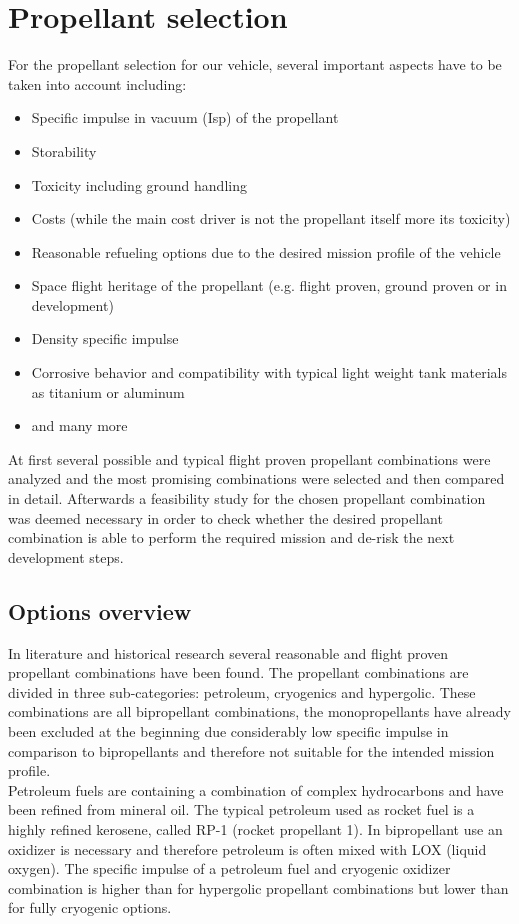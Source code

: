 \chapter{Propellant selection}
\qquad For the propellant selection for our vehicle, several important aspects have to be taken into account including:
\begin{itemize}
	\item 	Specific impulse in vacuum (Isp) of the propellant
	\item	Storability
	\item	Toxicity including ground handling
	\item	Costs (while the main cost driver is not the propellant itself more its toxicity)
	\item	Reasonable refueling options due to the desired mission profile of the vehicle
	\item	Space flight heritage of the propellant (e.g. flight proven, ground proven or in development)
	\item	Density specific impulse
	\item	Corrosive behavior and compatibility with typical light weight tank materials as titanium or aluminum
	\item	and many more
\end{itemize}

At first several possible and typical flight proven propellant combinations were analyzed and the most promising combinations were selected and then compared in detail. Afterwards a feasibility study for the chosen propellant combination was deemed necessary in order to check whether the desired propellant combination is able to perform the required mission and de-risk the next development steps.

\section{Options overview}
\qquad In literature and historical research several reasonable and flight proven propellant combinations have been found. The propellant combinations are divided in three sub-categories: petroleum, cryogenics and hypergolic. These combinations are all bipropellant combinations, the monopropellants have already been excluded at the beginning due considerably low specific impulse in comparison to bipropellants and therefore not suitable for the intended mission profile.\\

Petroleum fuels are containing a combination of complex hydrocarbons and have been refined from mineral oil. The typical petroleum used as rocket fuel is a highly refined kerosene, called RP-1 (rocket propellant 1). In bipropellant use an oxidizer is necessary and therefore petroleum is often mixed with LOX (liquid oxygen). The specific impulse of a petroleum fuel and cryogenic oxidizer combination is higher than for hypergolic propellant combinations but lower than for fully cryogenic options. \\

